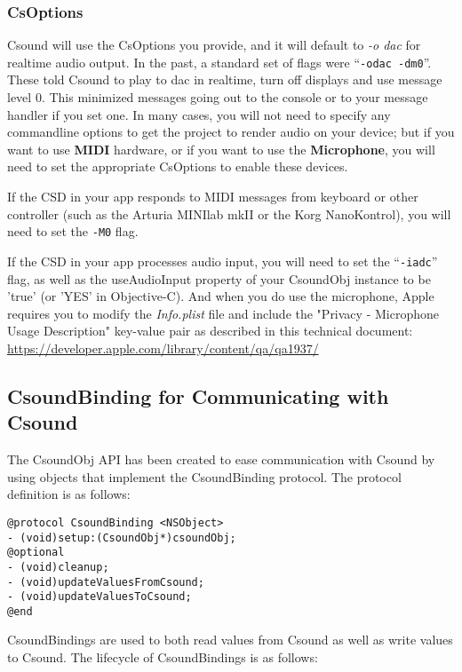 \documentclass[11pt]{article}
\begin{document}
\subsubsection{CsOptions}

Csound will use the CsOptions you provide, and it will default to \textit{-o dac} for realtime audio output. In the past, a standard set of flags were ``{\tt -odac -dm0}''. These told Csound to play to dac in realtime, turn off displays and use message level 0.  This minimized messages going out to the console or to your message handler if you set one. In many cases, you will not need to specify any commandline options to get the project to render audio on your device; but if you want to use \textbf{MIDI} hardware, or if you want to use the \textbf{Microphone}, you will need to set the appropriate CsOptions to enable these devices.  

If the CSD in your app responds to MIDI messages from keyboard or other controller (such as the Arturia MINIlab mkII or the Korg NanoKontrol),  you will need to set the {\tt -M0} flag. 

If the CSD in your app processes audio input, you will need to set the ``{\tt -iadc}'' flag, as well as the useAudioInput property of your CsoundObj instance to be 'true' (or 'YES' in Objective-C). And when you do use the microphone, Apple requires you to modify the \textit{Info.plist} file and include the "Privacy - Microphone Usage Description" key-value pair as described in this technical document: \url{https://developer.apple.com/library/content/qa/qa1937/}


\subsection{CsoundBinding for Communicating with Csound}

The CsoundObj API has been created to ease communication with Csound by using objects that implement the CsoundBinding protocol.  The protocol definition is as follows:

\begin{lstlisting}[caption=CsoundBinding Protocol Definition]
@protocol CsoundBinding <NSObject>
- (void)setup:(CsoundObj*)csoundObj;
@optional
- (void)cleanup;
- (void)updateValuesFromCsound;
- (void)updateValuesToCsound;
@end
\end{lstlisting}

CsoundBindings are used to both read values from Csound as well as write values to Csound.  The lifecycle of CsoundBindings is as follows:
\end{document}
